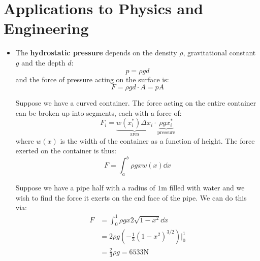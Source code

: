 \section{Applications to Physics and Engineering}
\begin{itemize}
    \item The \textbf{hydrostatic pressure} depends on the density $\rho$, gravitational constant $g$ and the depth $d$:
    \begin{equation}
        p = \rho g d
    \end{equation}
    and the force of pressure acting on the surface is:
    \begin{equation}
        F = \rho g d \cdot A = pA
    \end{equation}
    \begin{figure}[ht]
        \centering
    \end{figure}
    \begin{example}
        Suppose we have a curved container. The force acting on the entire container can be broken up into segments, each with a force of:
        \begin{equation}
            F_i = \underbrace{w(x_i^*)\Delta x_i}_\text{area} \cdot \underbrace{\rho gx_i^*}_\text{pressure}
        \end{equation}
        where $w(x)$ is the width of the container as a function of height. The force exerted on the container is thus:
        \begin{equation}
            F = \int_a^b \rho g x w(x) \dd{x}
        \end{equation}
    \end{example}
    \begin{example}
        Suppose we have a pipe half with a radius of $1\si{\meter}$ filled with water and we wish to find the force it exerts on the end face of the pipe. We can do this via:
        \begin{align}
            F &= \int_0^1 \rho gx 2\sqrt{1-x^2}\dd{x} \\ 
            &= 2\rho g\left(-\frac{1}{3}(1-x^2)^{3/2}\right)\Biggr|^1_0 \\ 
            &= \frac{2}{3}\rho g = 6533 \si{\newton}
        \end{align}
    \end{example}

\end{itemize}